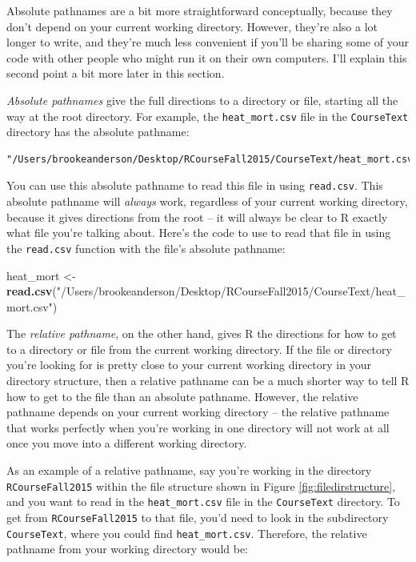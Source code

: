 \documentclass[]{book}
\makeatletter
\newenvironment{Shaded}{\begin{snugshade}}{\end{snugshade}}
\newcommand{\KeywordTok}[1]{\textcolor[rgb]{0.13,0.29,0.53}{\textbf{{#1}}}}
\newcommand{\StringTok}[1]{\textcolor[rgb]{0.31,0.60,0.02}{{#1}}}
\newcommand{\NormalTok}[1]{{#1}}
\newenvironment{kframe}{%
\medskip{}
\setlength{\fboxsep}{.8em}
 \def\at@end@of@kframe{}%
 \ifinner\ifhmode%
  \def\at@end@of@kframe{\end{minipage}}%
  \begin{minipage}{\columnwidth}%
 \fi\fi%
 \def\FrameCommand##1{\hskip\@totalleftmargin \hskip-\fboxsep
 \colorbox{shadecolor}{##1}\hskip-\fboxsep
     \hskip-\linewidth \hskip-\@totalleftmargin \hskip\columnwidth}%
 \MakeFramed {\advance\hsize-\width
   \@totalleftmargin\z@ \linewidth\hsize
   \@setminipage}}%
 {\par\unskip\endMakeFramed%
 \at@end@of@kframe}
\renewenvironment{Shaded}{\begin{kframe}}{\end{kframe}}
\makeatother
\begin{document}
Absolute pathnames are a bit more straightforward conceptually, because
they don't depend on your current working directory. However, they're
also a lot longer to write, and they're much less convenient if you'll
be sharing some of your code with other people who might run it on their
own computers. I'll explain this second point a bit more later in this
section.

\emph{Absolute pathnames} give the full directions to a directory or
file, starting all the way at the root directory. For example, the
\texttt{heat\_mort.csv} file in the \texttt{CourseText} directory has
the absolute pathname:

\begin{verbatim}
"/Users/brookeanderson/Desktop/RCourseFall2015/CourseText/heat_mort.csv"
\end{verbatim}

You can use this absolute pathname to read this file in using
\texttt{read.csv}. This absolute pathname will \emph{always} work,
regardless of your current working directory, because it gives
directions from the root -- it will always be clear to R exactly what
file you're talking about. Here's the code to use to read that file in
using the \texttt{read.csv} function with the file's absolute pathname:

\begin{Shaded}
\begin{Highlighting}[]
\NormalTok{heat_mort <-}\StringTok{ }\KeywordTok{read.csv}\NormalTok{(}\StringTok{"/Users/brookeanderson/Desktop/RCourseFall2015/CourseText/heat_mort.csv"}\NormalTok{)}
\end{Highlighting}
\end{Shaded}

The \emph{relative pathname}, on the other hand, gives R the directions
for how to get to a directory or file from the current working
directory. If the file or directory you're looking for is pretty close
to your current working directory in your directory structure, then a
relative pathname can be a much shorter way to tell R how to get to the
file than an absolute pathname. However, the relative pathname depends
on your current working directory -- the relative pathname that works
perfectly when you're working in one directory will not work at all once
you move into a different working directory.

As an example of a relative pathname, say you're working in the
directory \texttt{RCourseFall2015} within the file structure shown in
Figure \ref{fig:filedirstructure}, and you want to read in the
\texttt{heat\_mort.csv} file in the \texttt{CourseText} directory. To
get from \texttt{RCourseFall2015} to that file, you'd need to look in
the subdirectory \texttt{CourseText}, where you could find
\texttt{heat\_mort.csv}. Therefore, the relative pathname from your
working directory would be:
\end{document}
